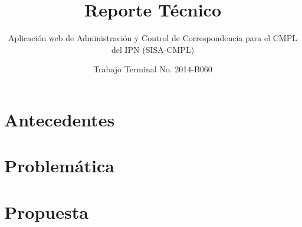 \documentclass[oneside,10pt]{book}
\title{Reporte Técnico}
\subtitle{Aplicación web de Administración y Control de Correspondencia para el CMPL del IPN (SISA-CMPL)}
\author{Trabajo Terminal No. 2014-B060}
\begin{document}
\maketitle
\thispagestyle{empty}

\frontmatter
\tableofcontents

\mainmatter

\chapter{Antecedentes}
	

\chapter{Problemática}


\chapter{Propuesta}











\end{document}
